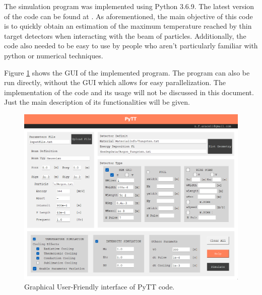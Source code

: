 The simulation program was implemented using Python 3.6.9. The latest version of the code can be found at \parencite[][]{ref:GitAra}. As aforementioned, the main objective of this code is to quickly obtain an estimation of the maximum temperature reached by thin target detectors when interacting with the beam of particles. Additionally, the code also needed to be easy to use by people who aren't particularly familiar with python or numerical techniques.

Figure \ref{fig:UserFriendly} shows the GUI of the implemented program. The program can also be run directly, without the GUI which allows for easy parallelization. The implementation of the code and its usage will not be discussed in this document. Just the main description of its functionalities will be given. 

\begin{figure}[h]
    \centering
    \includegraphics[width=0.9\columnwidth]{PyTT_GUI/PyTTScreanshot.png}
    \caption{Graphical User-Friendly interface of PyTT code.}
    \label{fig:UserFriendly}
\end{figure}

